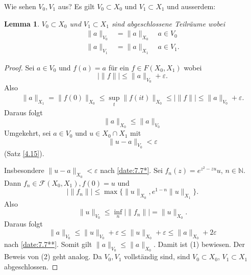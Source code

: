 \documentclass[
paper=a4,
bibtotocnumbered,
liststotocnumbered,
tablecaptionabove,
pointlessnumbers,
twoside,
openright,
10pt
]
{report}
\newtheorem{lem}[thm]{Lemma}
\theoremstyle{definition}
\numberwithin{equation}{chapter}
\begin{document}
Wie sehen $V_0, V_1$ aus? Es gilt $V_0 \subset X_0$ und $V_1 \subset X_1$ und ausserdem:
\begin{lem}\label{4.16}
$V_0 \subset X_0$ und $V_1\subset X_1$ sind abgeschlossene Teilräume wobei
\begin{align*}
\| a\|_{V_0} &= \| a\|_{X_0}\quad a\in V_0\\
\| a\|_{V_1} &= \| a\|_{X_1}\quad a \in V_1. 
\end{align*}
\end{lem}
\begin{proof}
Sei $a\in V_0$ und $f(a)=a$ für ein $f\in F(X_0, X_1)$ wobei 
\begin{equation}
|\| f\| | \le \| a\|_{V_0} + \varepsilon.
\end{equation}
Also
\begin{align*}
\| a\|_{X_1} = \| f(0)\|_{X_0} \le \sup_t \| f(it)\|_{X_0} \le |\| f\| | \le \| a \|_{V_0} + \varepsilon.
\end{align*}
Daraus folgt
\begin{equation}\label{date:7.7*}
\| a\|_{X_0} \le \| a\|_{V_0}
\end{equation}
Umgekehrt, sei $a\in V_0$ und $u\in X_0 \cap X_1$ mit \begin{equation}\label{date:7.7**}
\| u-a\|_{V_0} <\varepsilon
\end{equation} (Satz \ref{4.15}).

Insbesondere $\| u-a\|_{X_0} <\varepsilon$ nach \eqref{date:7.7*}.
Sei $f_n(z) =e^{z^2-zu} u$, $n\in \mathbb N$.  Dann $f_n \in \mathcal F(X_0, X_1), f(0) = u$ und
\begin{equation}
|\| f_n \| | \le \max\{ \| u\|_{X_0}, e^{1-n} \| u\|_{X_1} \}.
\end{equation}
Also
\begin{equation}
\| u\|_{V_0} \le \inf_n |\| f_n\| | = \| u\|_{X_0}.
\end{equation}
Daraus folgt
\begin{equation}
\| a\|_{V_0} \le \| u\|_{V_0} + \varepsilon \le \| u\|_{X_0} + \varepsilon \le \| a\|_{X_0} + 2\varepsilon
\end{equation}
nach \eqref{date:7.7**}. Somit gilt $\| a\|_{V_0}\le \| a\|_{X_0}$.
Damit ist (1) bewiesen. Der Beweis von (2) geht analog. Da $V_0, V_1$ vollständig sind, sind $V_0 \subset X_0$, $V_1 \subset X_1$ abgeschlossen.
\end{proof}
\end{document}
